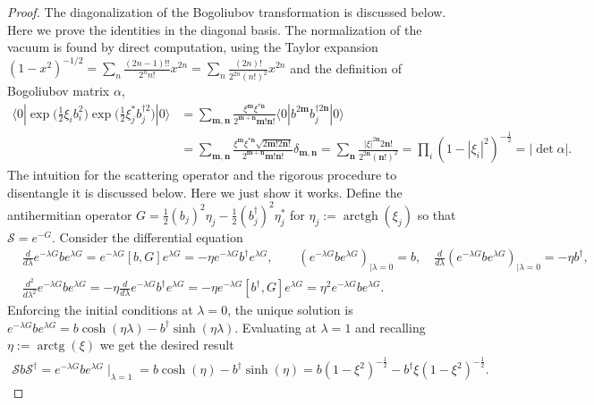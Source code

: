 \documentclass[../QFT_main.tex]{subfiles}
\begin{document}
\begin{proof}
The diagonalization of the Bogoliubov transformation is discussed below.
Here we prove the identities in the diagonal basis.
The normalization of the vacuum is found by direct computation, using the Taylor expansion $(1-x^2)^{-1/2} = \sum_{n} \frac{(2n-1)!!}{2^{n}n!} x^{2n}=\sum_{n} \frac{(2n)!}{2^{2n}(n!)^2} x^{2n}$ and the definition of Bogoliubov matrix $\alpha$,
{\small\begin{align}
    \langle 0| \exp\Big(\tfrac{1}{2} \xi_ib_i^2\Big) \exp\Big(\tfrac{1}{2} \xi_j^* b_j^{\dagger2}\Big) |0\rangle
    &= \sum_{\mathbf{m},\mathbf{n}}\frac{\xi^{\mathbf{m}}\xi^{*\mathbf{n}}}{2^{\mathbf{m}+\mathbf{n}}\mathbf{m}!\mathbf{n}!}\langle 0| b^{2\mathbf
    m} b_j^{\dagger2\mathbf{n}}|0\rangle \\
    &= \sum_{\mathbf{m},\mathbf{n}}\frac{\xi^{\mathbf{m}}\xi^{*\mathbf{n}}\sqrt{2\mathbf{m}!2\mathbf{n}!}}{2^{\mathbf{m}+\mathbf{n}}\mathbf{m}!\mathbf{n}!}\delta_{\mathbf{m},\mathbf{n}} = \sum_{\mathbf{n}}\frac{|\xi|^{2\mathbf{n}}2\mathbf{n}!}{2^{2\mathbf{n}}(\mathbf{n}!)^2} = \prod_i (1-|\xi_i|^2)^{-\tfrac12} = |\det\alpha|.
\end{align}}
The intuition for the scattering operator and the rigorous procedure to disentangle it is discussed below.
Here we just show it works.
Define the antihermitian operator $G= \tfrac12 (b_j)^2\eta_j-\tfrac12 (b_j^\dagger)^2\eta^*_j$ for $\eta_j:=\operatorname{arctgh}(\xi_j)$ so that $\mathcal{S}= e^{-G}$.
Consider the differential equation
{\small\begin{align}
    &\frac{d}{d\lambda} e^{-\lambda G} b e^{\lambda G} = e^{-\lambda G} [b,G] e^{\lambda G} = -\eta e^{-\lambda G} b^\dagger e^{\lambda G}, \qquad (e^{-\lambda G} b e^{\lambda G})_{|\lambda=0}= b,\quad \frac{d}{d\lambda}(e^{-\lambda G} b e^{\lambda G})_{|\lambda=0}= -\eta b^\dagger,\\[3pt]
    &\frac{d^2}{d\lambda^2}e^{-\lambda G} b e^{\lambda G} = -\eta \frac{d}{d\lambda} e^{-\lambda G} b^\dagger e^{\lambda G} =-\eta e^{-\lambda G} [b^\dagger,G] e^{\lambda G}=\eta^2 e^{-\lambda G} b e^{\lambda G}.
\end{align}}
Enforcing the initial conditions at $\lambda=0$, the unique solution is $e^{-\lambda G} b e^{\lambda G} = b \cosh(\eta\lambda)-b^\dagger \sinh(\eta\lambda)$.
Evaluating at $\lambda=1$ and recalling $\eta:=\operatorname{arctg}(\xi)$ we get the desired result
\begin{align}
    \mathcal{S} b \mathcal{S}^\dagger = e^{-\lambda G} b e^{\lambda G}\mid_{\lambda=1} = b \cosh(\eta) - b^\dagger \sinh(\eta) = b (1-\xi^2)^{-\tfrac12} - b^\dagger \xi (1-\xi^2)^{-\tfrac12}.
\end{align}
\end{proof}
\end{document}
